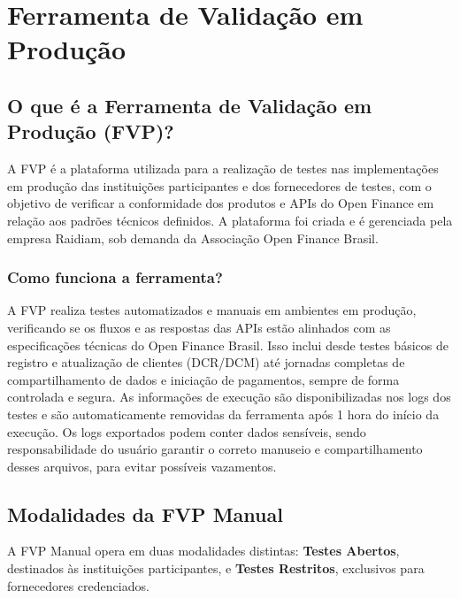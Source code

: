 \chapter{Ferramenta de Validação em Produção}

\section{O que é a Ferramenta de Validação em Produção (FVP)?}
A FVP é a plataforma utilizada para a realização de testes nas implementações em produção das instituições participantes e dos fornecedores de testes, com o objetivo de verificar a conformidade dos produtos e APIs do Open Finance em relação aos padrões técnicos definidos.
\medskip
A plataforma foi criada e é gerenciada pela empresa Raidiam, sob demanda da Associação Open Finance Brasil. 

\subsection{Como funciona a ferramenta?}
A FVP realiza testes automatizados e manuais em ambientes em produção, verificando se os fluxos e as respostas das APIs estão alinhados com as especificações técnicas do Open Finance Brasil. Isso inclui desde testes básicos de registro e atualização de clientes (DCR/DCM) até jornadas completas de compartilhamento de dados e iniciação de pagamentos, sempre de forma controlada e segura. 
\medskip
As informações de execução são disponibilizadas nos logs dos testes e são automaticamente removidas da ferramenta após 1 hora do início da execução. Os logs exportados podem conter dados sensíveis, sendo responsabilidade do usuário garantir o correto manuseio e compartilhamento desses arquivos, para evitar possíveis vazamentos. 

\section{Modalidades da FVP Manual}

A FVP Manual opera em duas modalidades distintas: \textbf{Testes Abertos}, destinados às instituições participantes, e \textbf{Testes Restritos}, exclusivos para fornecedores credenciados.

\begin{figure}[H]
\centering %
\label{fig:fvpimage2}
\end{figure}

